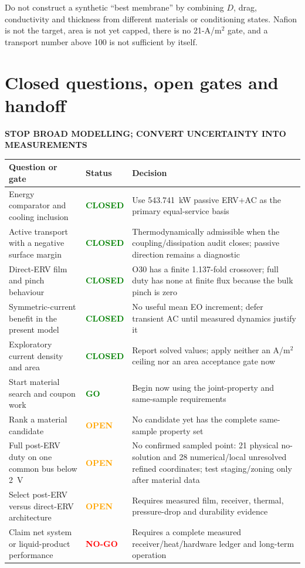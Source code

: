 \documentclass[10pt,a4paper]{article}
\newcommand{\eyebrow}[1]{{\sffamily\bfseries\small\color{Teal}\MakeUppercase{#1}}}
\begin{document}
\begin{warningbox}
Do not construct a synthetic ``best membrane'' by combining $D$, drag,
conductivity and thickness from different materials or conditioning states.
Nafion is not the target, area is not yet capped, there is no 21-A/m$^2$ gate,
and a transport number above 100 is not sufficient by itself.
\end{warningbox}

\section{Closed questions, open gates and handoff}
\eyebrow{Stop broad modelling; convert uncertainty into measurements}

\begin{center}\small
\begin{tabularx}{\textwidth}{@{}p{45mm}p{20mm}Y@{}}
\toprule
\textbf{Question or gate} & \textbf{Status} & \textbf{Decision} \\
\midrule
Energy comparator and cooling inclusion & \textcolor{Green}{\textbf{CLOSED}} & Use 543.741~kW passive ERV+AC as the primary equal-service basis \\
Active transport with a negative surface margin & \textcolor{Green}{\textbf{CLOSED}} & Thermodynamically admissible when the coupling/dissipation audit closes; passive direction remains a diagnostic \\
Direct-ERV film and pinch behaviour & \textcolor{Green}{\textbf{CLOSED}} & O30 has a finite 1.137-fold crossover; full duty has none at finite flux because the bulk pinch is zero \\
Symmetric-current benefit in the present model & \textcolor{Green}{\textbf{CLOSED}} & No useful mean EO increment; defer transient AC until measured dynamics justify it \\
Exploratory current density and area & \textcolor{Green}{\textbf{CLOSED}} & Report solved values; apply neither an A/m$^2$ ceiling nor an area acceptance gate now \\
Start material search and coupon work & \textcolor{Green}{\textbf{GO}} & Begin now using the joint-property and same-sample requirements \\
Rank a material candidate & \textcolor{Orange}{\textbf{OPEN}} & No candidate yet has the complete same-sample property set \\
Full post-ERV duty on one common bus below 2~V & \textcolor{Orange}{\textbf{OPEN}} & No confirmed sampled point: 21 physical no-solution and 28 numerical/local unresolved refined coordinates; test staging/zoning only after material data \\
Select post-ERV versus direct-ERV architecture & \textcolor{Orange}{\textbf{OPEN}} & Requires measured film, receiver, thermal, pressure-drop and durability evidence \\
Claim net system or liquid-product performance & \textcolor{Red}{\textbf{NO-GO}} & Requires a complete measured receiver/heat/hardware ledger and long-term operation \\
\bottomrule
\end{tabularx}
\end{center}
\end{document}
